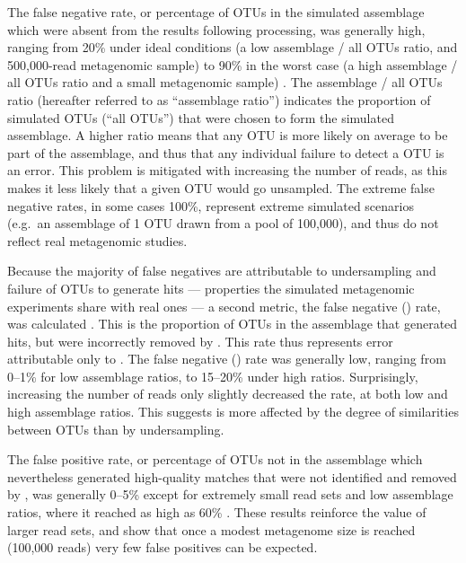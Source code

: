 The false negative rate, or percentage of \acp{OTU} in the simulated assemblage which were absent from the  results following  processing, was generally high, ranging from \textapprox{}20\% under ideal conditions (a low assemblage / all \acp{OTU} ratio, and 500,000-read metagenomic sample) to \textapprox{}90\% in the worst case (a high assemblage / all \acp{OTU} ratio and a small metagenomic sample) .
The assemblage / all \acp{OTU} ratio (hereafter referred to as ``assemblage ratio'') indicates the proportion of simulated \acp{OTU} (``all \acp{OTU}'') that were chosen to form the simulated assemblage.
A higher ratio means that any \ac{OTU} is more likely on average to be part of the assemblage, and thus that any individual failure to detect a \ac{OTU} is an error.
This problem is mitigated with increasing the number of reads, as this makes it less likely that a given \ac{OTU} would go unsampled.
The extreme false negative rates, in some cases 100\%, represent extreme simulated scenarios (e.g.\ an assemblage of 1 \ac{OTU} drawn from a pool of 100,000), and thus do not reflect real metagenomic studies.

Because the majority of false negatives are attributable to undersampling and failure of \acp{OTU} to generate  hits --- properties the simulated metagenomic experiments share with real ones --- a second metric, the false negative () rate, was calculated .
This is the proportion of \acp{OTU} in the assemblage that generated  hits, but were incorrectly removed by .
This rate thus represents error attributable only to .
The false negative () rate was generally low, ranging from \textapprox{}0--1\% for low assemblage ratios, to \textapprox{}15--20\% under high ratios.
Surprisingly, increasing the number of reads only slightly decreased the rate, at both low and high assemblage ratios.
This suggests  is more affected by the degree of similarities between \acp{OTU} than by undersampling.

The false positive rate, or percentage of \acp{OTU} not in the assemblage which nevertheless generated high-quality  matches that were not identified and removed by , was generally \textapprox{}0--5\% except for extremely small read sets and low assemblage ratios, where it reached as high as 60\% .
These results reinforce the value of larger read sets, and show that once a modest metagenome size is reached (\textapprox{}100,000 reads) very few false positives can be expected.


